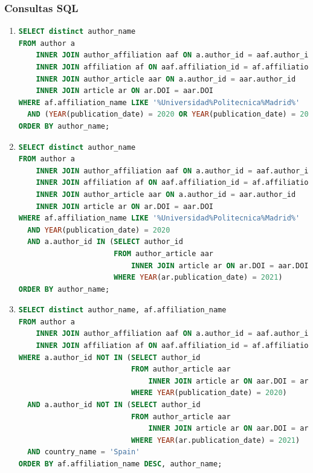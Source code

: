 \documentclass{db-practice}
\begin{document}
\subsubsection*{Consultas SQL}
\begin{enumerate}
\item
\begin{lstlisting}[language=SQL]
SELECT distinct author_name
FROM author a 
    INNER JOIN author_affiliation aaf ON a.author_id = aaf.author_id
    INNER JOIN affiliation af ON aaf.affiliation_id = af.affiliation_id
    INNER JOIN author_article aar ON a.author_id = aar.author_id
    INNER JOIN article ar ON ar.DOI = aar.DOI
WHERE af.affiliation_name LIKE '%Universidad%Politecnica%Madrid%'
  AND (YEAR(publication_date) = 2020 OR YEAR(publication_date) = 2021)
ORDER BY author_name;
\end{lstlisting}

\item
\begin{lstlisting}[language=SQL]
SELECT distinct author_name
FROM author a 
    INNER JOIN author_affiliation aaf ON a.author_id = aaf.author_id
    INNER JOIN affiliation af ON aaf.affiliation_id = af.affiliation_id
    INNER JOIN author_article aar ON a.author_id = aar.author_id
    INNER JOIN article ar ON ar.DOI = aar.DOI
WHERE af.affiliation_name LIKE '%Universidad%Politecnica%Madrid%'
  AND YEAR(publication_date) = 2020 
  AND a.author_id IN (SELECT author_id 
                      FROM author_article aar 
                          INNER JOIN article ar ON ar.DOI = aar.DOI
                      WHERE YEAR(ar.publication_date) = 2021) 
ORDER BY author_name;
\end{lstlisting}

\item
\begin{lstlisting}[language=SQL]
SELECT distinct author_name, af.affiliation_name
FROM author a 
    INNER JOIN author_affiliation aaf ON a.author_id = aaf.author_id
    INNER JOIN affiliation af ON aaf.affiliation_id = af.affiliation_id
WHERE a.author_id NOT IN (SELECT author_id
                          FROM author_article aar 
                              INNER JOIN article ar ON aar.DOI = ar.DOI
                          WHERE YEAR(publication_date) = 2020)
  AND a.author_id NOT IN (SELECT author_id 
                          FROM author_article aar 
                              INNER JOIN article ar ON aar.DOI = ar.DOI
                          WHERE YEAR(ar.publication_date) = 2021) 
  AND country_name = 'Spain'                        
ORDER BY af.affiliation_name DESC, author_name;
\end{lstlisting}


\end{enumerate}
\end{document}
